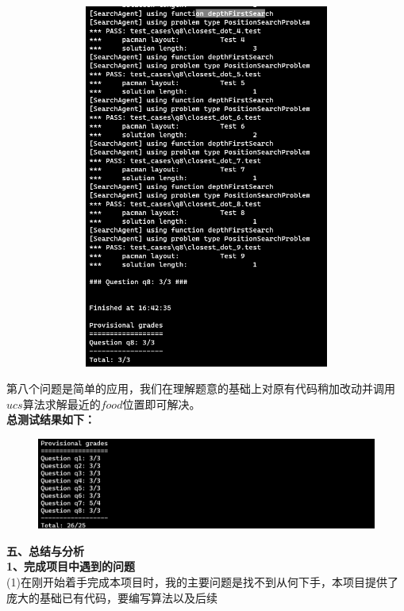 \documentclass[a4paper,12pt,UTF8]{article}
\begin{document}
\begin{flushleft}
{{{        }
    }
    \begin{figure}[h]
        \centering
        \includegraphics[width=12cm,height=12cm]{8-2.png}
    \end{figure}
    \normalsize{
        \hspace{1cm}第八个问题是简单的应用，我们在理解题意的基础上对原有代码稍加改动并调用
        $ucs$算法求解最近的$food$位置即可解决。\\
    }
    \large{
        \hspace{1cm}\textbf{
           总测试结果如下：\\
        }
    }
    \begin{figure}[h]
        \centering
        \includegraphics[width=12cm,height=3cm]{9.png}
    \end{figure}
    \newpage
    \Large{
        \textbf{
            五、总结与分析\\
        }
    }
    \large{
        \textbf{
            1、完成项目中遇到的问题\\
        }
    }
    \normalsize{
        \hspace{1cm}(1)在刚开始着手完成本项目时，我的主要问题是找不到从何下手，本项目提供了庞大的基础已有代码，要编写算法以及后续
}}
\end{flushleft}
\end{document}
